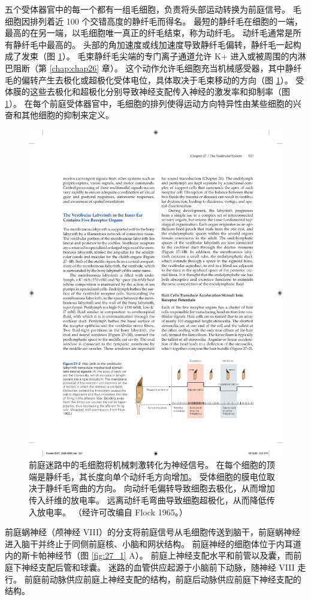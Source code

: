 五个受体器官中的每一个都有一组毛细胞，负责将头部运动转换为前庭信号。
毛细胞因排列着近 100 个交错高度的静纤毛而得名。
最短的静纤毛在细胞的一端，最高的在另一端，以毛细胞唯一真正的纤毛结束，称为动纤毛。
动纤毛通常是所有静纤毛中最高的。
头部的角加速度或线加速度导致静纤毛偏转，静纤毛一起构成了发束（图 \ref{fig:27_2}）。 
毛束静纤毛尖端的专门离子通道允许 K+ 进入或被周围的内淋巴阻断（第 \ref{chap:chap26} 章）。 
这个动作允许毛细胞充当机械感受器，其中静纤毛的偏转产生去极化或超极化受体电位，具体取决于毛束移动的方向（图 \ref{fig:27_2}）。 
受体膜的这些去极化和超极化分别导致神经支配传入神经的激发率和抑制率（图 \ref{fig:27_2}）。 
在每个前庭受体器官中，毛细胞的排列使得运动方向特异性由某些细胞的兴奋和其他细胞的抑制来定义。


\begin{figure}[htbp]
	\centering
	\includegraphics[width=0.7\linewidth]{chap27/fig_27_2}
	\caption{前庭迷路中的毛细胞将机械刺激转化为神经信号。 在每个细胞的顶端是静纤毛，其长度向单个动纤毛方向增加。 受体细胞的膜电位取决于静纤毛弯曲的方向。 向动纤毛偏转导致细胞去极化，从而增加传入纤维的放电率。 远离动纤毛弯曲导致细胞超极化，从而降低传入放电率。 （经许可改编自 Flock 1965。）}
	\label{fig:27_2}
\end{figure}


前庭蜗神经（颅神经 VIII）的分支将前庭信号从毛细胞传送到脑干，前庭蜗神经进入脑干并终止于同侧前庭核、小脑和网状结构。
前庭神经的细胞体位于内耳道内的斯卡帕神经节（图 \ref{fig:27_1} A）。
前庭上神经支配水平和前管以及囊，而前庭下神经支配后管和球囊。
迷路的血管供应起源于小脑前下动脉，随神经 VIII 走行。
前庭前动脉供应前庭上神经支配的结构，前庭后动脉供应前庭下神经支配的结构。


